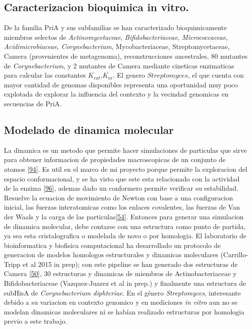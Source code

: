 \documentclass[12pt,twoside]{reedthesis}
\begin{document}
  \subsection{Caracterizacion bioquimica in
  vitro.}\label{caracterizacion-bioquimica-in-vitro.}
  
  De la familia PriA y sus subfamilias se han caracterizado
  bioquimicamente miembros selectos de \emph{Actinomycetaceae},
  \emph{Bifidobacteriaceae}, \emph{Micrococcaceae},
  \emph{Acidimicrobiaceae}, \emph{Corynebacterium}, Mycobacteriaceae,
  Streptomycetaceae, Camera (provenientes de metagenoma), reconstrucciones
  ancestrales, 80 mutantes de \emph{Corynebacterium}, y 2 mutantes de
  Camera mediante cineticas enzimaticas para calcular las constantes
  \(K_{cat}\),\(K_m\). El genero \(Streptomyces\), el que cuenta con mayor
  cantidad de genomas disponibles representa una oportunidad muy poco
  explotada de explorar la influencia del contexto y la vecindad genomicas
  en secuencias de PriA.
  
  \subsection{Modelado de dinamica
  molecular}\label{modelado-de-dinamica-molecular}
  
  La dinamica es un metodo que permite hacer simulaciones de particulas
  que sirve para obtener informacion de propiedades macroscopicas de un
  conjunto de atomos
  {[}\protect\hyperlink{ref-petrenko_molecular_2001}{94}{]}. Es util en el
  marco de mi proyecto porque permite la exploracion del espacio
  conformacional, y se ha visto que este esta relacionado con la actividad
  de la enzima {[}\protect\hyperlink{ref-sikosek_biophysics_2014}{96}{]},
  ademas dado un conformero permite verificar su estabilidad. Resuelve la
  ecuacion de movimiento de Newton con base a una configuracion inicial,
  las fuerzas interatomicas como los enlaces covalentes, las fuerzas de
  Van der Waals y la carga de las
  particulas{[}\protect\hyperlink{ref-campbell_biophysical_2012}{54}{]}.
  Entonces para generar una simulacion de dinamica molecular, debe
  contarse con una estructura como punto de partida, ya sea esta
  cristalografica o modelada de novo o por homologia. El laboratorio de
  bioinformatica y biofisica computacional ha desarrollado un protocolo de
  generacion de modelos homologos estructurales y dinamicas moleculares
  (Carrillo-Tripp et al 2015 in prep); con este pipeline se han generado
  dos estructuras de Camera
  {[}\protect\hyperlink{ref-noda-garcia_insights_2015}{50}{]}, 30
  estructuras y dinamicas de miembros de Actinobacteriaceae y
  Bifidobacteriaceae (Vazquez-Juarez et al in prep.) y finalmente una
  estructura de subHisA de \emph{Corynebacterium diphteriae}. En el género
  \emph{Streptomyces}, interesante debido a su variacion en contexto
  genomico y en mediciones \emph{in vitro} aun no se modelan dinamicas
  moleculares ni se habían realizado estructuras por homologia previo a
  este trabajo.
  
\end{document}
